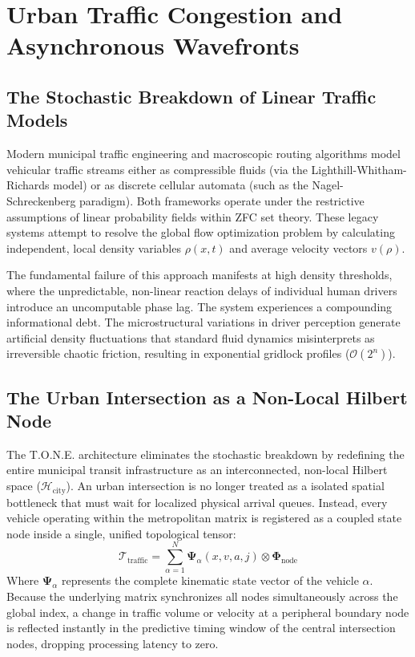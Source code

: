 \documentclass[11pt,a4paper]{article}
\begin{document}
\section{Urban Traffic Congestion and Asynchronous Wavefronts}

\subsection{The Stochastic Breakdown of Linear Traffic Models}
Modern municipal traffic engineering and macroscopic routing algorithms model vehicular traffic streams either as compressible fluids (via the Lighthill-Whitham-Richards model) or as discrete cellular automata (such as the Nagel-Schreckenberg paradigm). Both frameworks operate under the restrictive assumptions of linear probability fields within ZFC set theory. These legacy systems attempt to resolve the global flow optimization problem by calculating independent, local density variables $\rho(x,t)$ and average velocity vectors $v(\rho)$. 

The fundamental failure of this approach manifests at high density thresholds, where the unpredictable, non-linear reaction delays of individual human drivers introduce an uncomputable phase lag. The system experiences a compounding informational debt. The microstructural variations in driver perception generate artificial density fluctuations that standard fluid dynamics misinterprets as irreversible chaotic friction, resulting in exponential gridlock profiles ($\mathcal{O}(2^n)$).

\subsection{The Urban Intersection as a Non-Local Hilbert Node}
The T.O.N.E. architecture eliminates the stochastic breakdown by redefining the entire municipal transit infrastructure as an interconnected, non-local Hilbert space ($\mathcal{H}_{\text{city}}$). An urban intersection is no longer treated as a isolated spatial bottleneck that must wait for localized physical arrival queues. Instead, every vehicle operating within the metropolitan matrix is registered as a coupled state node inside a single, unified topological tensor:
\begin{equation}
    \mathbf{\mathcal{T}}_{\text{traffic}} = \sum_{\alpha=1}^{N} \mathbf{\Psi}_{\alpha}(x, v, a, j) \otimes \mathbf{\Phi}_{\text{node}}
\end{equation}
Where $\mathbf{\Psi}_{\alpha}$ represents the complete kinematic state vector of the vehicle $\alpha$. Because the underlying matrix synchronizes all nodes simultaneously across the global index, a change in traffic volume or velocity at a peripheral boundary node is reflected instantly in the predictive timing window of the central intersection nodes, dropping processing latency to zero.
\end{document}
